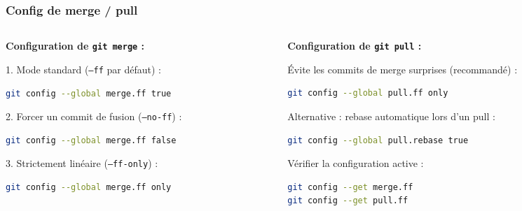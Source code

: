 \documentclass[
	11pt,
	aspectratio=169
]{beamer}
\begin{document}
\begin{frame}[fragile]
    \frametitle{Config de merge / pull}

    \begin{columns}[t]
        \begin{column}{0.48\textwidth}
            \textbf{Configuration de \texttt{git merge} :}

            \vskip 4pt
            \scriptsize
            1. Mode standard (\texttt{--ff} par défaut) :
\begin{lstlisting}[language=bash]
git config --global merge.ff true
\end{lstlisting}

            2. Forcer un commit de fusion (\texttt{--no-ff}) :
\begin{lstlisting}[language=bash]
git config --global merge.ff false
\end{lstlisting}

            3. Strictement linéaire (\texttt{--ff-only}) :
\begin{lstlisting}[language=bash]
git config --global merge.ff only
\end{lstlisting}
        \end{column}

        \begin{column}{0.48\textwidth}
            \textbf{Configuration de \texttt{git pull} :}

            \vskip 4pt
            \scriptsize
            Évite les commits de merge surprises (recommandé) :
\begin{lstlisting}[language=bash]
git config --global pull.ff only
\end{lstlisting}

            Alternative : rebase automatique lors d'un pull :
\begin{lstlisting}[language=bash]
git config --global pull.rebase true
\end{lstlisting}

            \vskip 6pt
            Vérifier la configuration active :
\begin{lstlisting}[language=bash]
git config --get merge.ff
git config --get pull.ff
\end{lstlisting}
        \end{column}
    \end{columns}
\end{frame}
\end{document}
